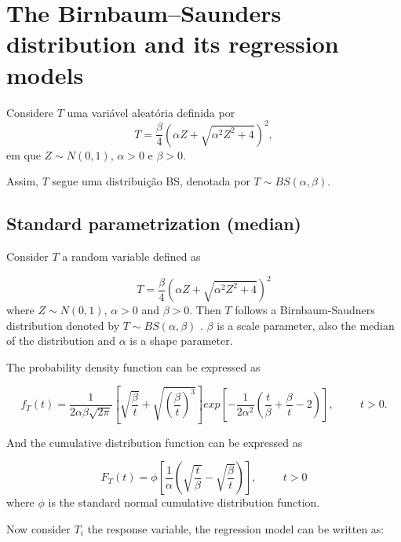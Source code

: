\documentclass[12pt]{article}%
\numberwithin{equation}{section} %
\begin{document}
\section{The Birnbaum--Saunders distribution and its regression models}

Considere \( T \) uma variável aleatória definida por
\[
T = \frac{\beta}{4}\left(\alpha Z + \sqrt{\alpha^2 Z^2 + 4}\right)^2,
\]
em que \( Z \sim N(0,1) \), \( \alpha > 0 \) e \( \beta > 0 \).

Assim, \( T \) segue uma distribuição BS, denotada por \( T \sim BS(\alpha, \beta) \). 

\citeauthor{bs1969}

\subsection{Standard parametrization (median)}

Consider $T$ a random variable defined as

\begin{equation}
    T=\frac{\beta}{4}\left(\alpha Z+ \sqrt{\alpha^2Z^2 + 4}\right)^2
\end{equation}
where $Z \sim N(0,1)$, $\alpha>0$ and $\beta>0$. Then $T$ follows a Birnbaum-Saudners distribution denoted by $T \sim BS(\alpha, \beta)$ \cite{bs1969}. $\beta$ is a scale parameter, also the median of the distribution and $\alpha$ is a shape parameter.

The probability density function can be expressed as

\begin{equation}
    f_T(t) = \frac{1}{2\alpha \beta \sqrt{2 \pi}}\left[ \sqrt{\frac{\beta}{t}}+\sqrt{\left(\frac{\beta}{t}\right)^3}\right] exp \left[-\frac{1}{2\alpha^2 }\left(\frac{t}{\beta}+\frac{\beta}{t}-2\right)\right], \hspace{1cm} t>0.
\end{equation}

And the cumulative distribution function can be expressed as 

\begin{equation}
    F_T(t) = \phi \left[\frac{1}{\alpha}\left( \sqrt{\frac{t}{\beta}}-\sqrt{\frac{\beta}{t}}\right) \right], \hspace{1cm} t>0
\end{equation}
where $\phi$ is the  standard normal cumulative distribution function.

Now consider $T_i$ the response variable, the regression model can be written as:
\end{document}
